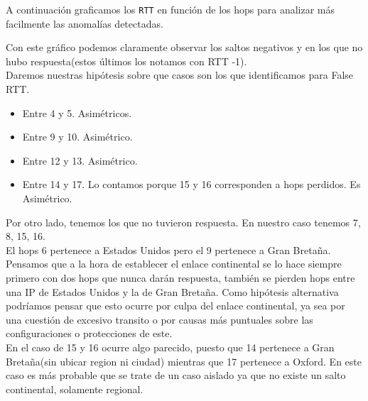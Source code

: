 A continuación graficamos los \texttt{RTT} en función de los hops para analizar más facilmente las anomalías detectadas.

\begin{figure}[H]
    \centering
\end{figure}

Con este gráfico podemos claramente observar los saltos negativos y en los que no hubo respuesta(estos
últimos los notamos con RTT -1).\\

Daremos nuestras hipótesis sobre que casos son los que identificamos para False RTT.\\

\begin{itemize}
\item Entre 4 y 5. Asimétricos.
\item Entre 9 y 10. Asimétrico.
\item Entre 12 y 13. Asimétrico.
\item Entre 14 y 17. Lo contamos porque 15 y 16 corresponden a hops perdidos. Es Asimétrico.
\end{itemize}

Por otro lado, tenemos los que no tuvieron respuesta. En nuestro caso tenemos 7, 8, 15, 16.\\

El hops 6 pertenece a Estados Unidos pero el 9 pertenece a Gran Bretaña. Pensamos que a la hora de
establecer el enlace continental se lo hace siempre primero con dos hops que nunca darán respuesta, también se
pierden hops entre una IP de Estados Unidos y la de Gran Bretaña. Como hipótesis alternativa
podríamos pensar que esto ocurre por culpa del enlace continental, ya sea por una cuestión de
excesivo transito o por causas más puntuales sobre las configuraciones o protecciones de este.\\

En el caso de 15 y 16 ocurre algo parecido, puesto que 14 pertenece a Gran Bretaña(sin ubicar region
ni ciudad) mientras que 17 pertenece a Oxford. En este caso es más probable que se trate de un caso aislado
ya que no existe un salto continental, solamente regional.\\

